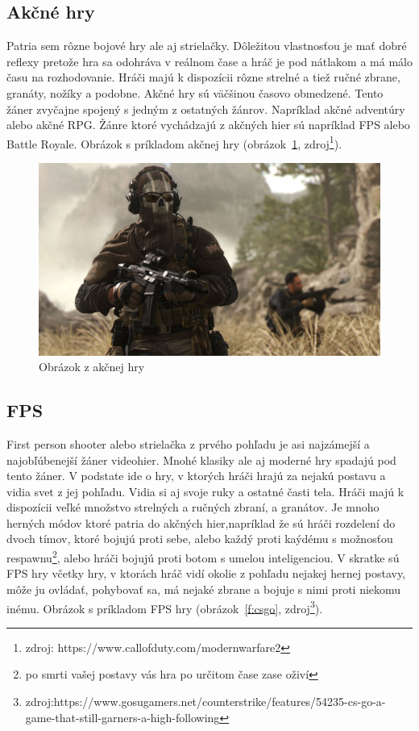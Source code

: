 \documentclass[10pt,oneside,slovak,a4paper]{article}
\begin{document}
\subsection{Akčné hry} \label{zanre:akcne}

Patria sem rôzne bojové hry ale aj strielačky. Dôležitou vlastnosťou je mať dobré reflexy pretože hra sa odohráva v reálnom čase a hráč je pod nátlakom a má málo času na rozhodovanie. Hráči majú k dispozícii rôzne strelné a tiež ručné zbrane, granáty, nožíky a podobne. Akčné hry sú väčšinou časovo obmedzené. Tento žáner zvyčajne spojený s jedným z ostatných žánrov. Napríklad akčné adventúry alebo akčné RPG. Žánre ktoré vychádzajú z akčných hier sú napríklad FPS alebo Battle Royale. Obrázok s príkladom akčnej hry (obrázok~\ref{f:akcne}, zdroj\footnote{zdroj: https://www.callofduty.com/modernwarfare2}).

\begin{figure}[tbh]
\centering
\includegraphics[scale=0.1]{mw2.jpg}
\caption{Obrázok z akčnej hry}
\label{f:akcne}
\end{figure}



\subsection{FPS} \label{zanre:fps}

First person shooter alebo strielačka z prvého pohľadu je asi najzámejší a najobľúbenejší žáner videohier. Mnohé klasiky ale aj moderné hry spadajú pod tento žáner. V podstate ide o hry, v ktorých hráči hrajú za nejakú postavu a vidia svet z jej pohľadu. Vidia si aj svoje ruky a ostatné časti tela. Hráči majú k dispozícii veľké množstvo strelných a ručných zbraní, a granátov. Je mnoho herných módov ktoré patria do akčných hier,napríklad že sú hráči rozdelení do dvoch tímov, ktoré bojujú proti sebe, alebo každý proti kaýdému s možnosťou respawnu\footnote{po smrti vašej postavy vás hra po určitom čase zase oživí}, alebo hráči bojujú proti botom s umelou inteligenciou. V skratke sú FPS hry včetky hry, v ktorách hráč vidí okolie z pohľadu nejakej hernej postavy, môže ju ovládať, pohybovať sa, má nejaké zbrane a bojuje s nimi proti niekomu inému. Obrázok s príkladom FPS hry (obrázok~\ref{f:csgo}, zdroj\footnote{zdroj:https://www.gosugamers.net/counterstrike/features/54235-cs-go-a-game-that-still-garners-a-high-following}). 
\end{document}
